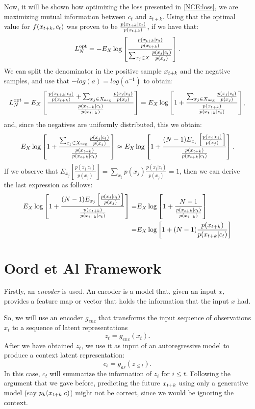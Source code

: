 Now, it will be shown how optimizing the loss presented in \ref{NCE:loss}, we are maximizing mutual information between $c_t$ and $z_{t+k}$. Using that the optimal value for $f(x_{t+k},c_t)$ was proven to be $\frac{p(x_{t+k}|c_t)}{p(x_{t+k})}$, if we have that:
\[
L_N^{\operatorname{opt}} = - E_X \log \left[ \frac{\frac{p(x_{t+k}|c_t)}{p(x_{t+k})}}{ \sum_{x_j \in X} \frac{p(x_{j}|c_t)}{p(x_{j})}} \right].
\]
We can split the denominator in the positive sample $x_{t+k}$ and the negative samples, and use that $-log(a) = log(a^{-1})$ to obtain:
\[
L_N^{\operatorname{opt}} = E_X \left[\frac{ \frac{p(x_{t+k}|c_t)}{p(x_{t+k})} + \sum_{x_j \in X_{\operatorname{neg}}} \frac{p(x_j|c_t)}{p(x_j)}  } {\frac{p(x_{t+k}|c_t)}{p(x_{t+k})} } \right] = E_X \log \left[ 1+ \frac{\sum_{x_j \in X_{\operatorname{neg}}}\frac{p(x_j|c_t)}{p(x_j)}}{\frac{p(x_{t+k})}{p(x_{t+k}|c_t)}} \right],
\]
and, since the negatives are uniformly distributed, this we obtain:
\[
E_X \log \left[ 1+ \frac { \sum_{x_j \in X_{\operatorname{neg}}} \frac{p(x_j|c_t)}{p(x_j)}} {\frac{p(x_{t+k})}{p(x_{t+k}|c_t)}} \right] \approx E_X \log \left[ 1+ \frac{ (N-1) E_{x_j}  \left[ \frac{p(x_j|c_t)}{p(x_j)}\right]}{\frac{p(x_{t+k})}{p(x_{t+k}|c_t)}} \right].
\]
If we observe that $E_{x_j} \left[ \frac{p(x_j|c_t)}{p(x_j)} \right] = \sum_{x_j} p(x_j) \frac{p(x_j|c_t)}{p(x_j)} = 1$, then we can derive the last expression as follows:
\begin{align*}
E_X \log \left[ 1+ \frac{ (N-1) E_{x_j}  \left[ \frac{p(x_j|c_t)}{p(x_j)}\right]}{\frac{p(x_{t+k})}{p(x_{t+k}|c_t)}} \right] =  & E_X \log \left[ 1 + \frac{N-1}{ \frac{p(x_{t+k}|c_t)}{p(x_{t+k})}}\right]\\
 = & E_X \log \left[ 1+ (N-1)\frac{p(x_{t+k})}{p(x_{t+k}|c_t)}\right]
\end{align*}


\section{Oord et Al Framework}


Firstly, an \emph{encoder} is used. An encoder is a model that, given an input $x$, provides a feature map or vector that holds the information
that the input $x$ had.

So, we will use an encoder $g_{enc}$ that transforms the input sequence of observations $x_t$ to a sequence of latent representations
$$
z_t = g_{enc}(x_t).
$$
After we have obtained $z_t$, we use it as input of an autoregressive model to produce a context latent representation:
$$
c_t = g_{ar}(z_{\leq t}).
$$
In this case, $c_t$ will summarize the information of $z_i$ for $i \leq t$. Following the argument that we gave before, predicting the future $x_{t+k}$ using only a generative model (say $p_k(x_{t+k}|c)$)
might not be correct, since we would be ignoring the context. \\


